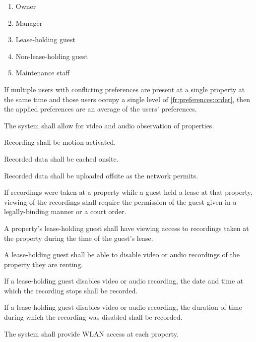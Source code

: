 \documentclass[letter,titlepage,oneside,english]{report}
\begin{document}
\begin{fr}
\begin{fr}
    \begin{enumerate}
    \item
      Owner
    \item
      Manager
    \item
      Lease-holding guest
    \item
      Non-lease-holding guest
    \item
      Maintenance staff
    \end{enumerate}
  \item
    If multiple users with conflicting preferences are present at a single property at the same time and those users occupy a single level of \ref{fr:preferences:order}, then the applied preferences are an average of the users' preferences.
  \end{fr}
\item
  The system shall allow for video and audio observation of properties.
  \begin{fr}
  \item
    Recording shall be motion-activated.
  \item
    Recorded data shall be cached onsite.
  \item
    Recorded data shall be uploaded offsite as the network permits.
  \item
    If recordings were taken at a property while a guest held a lease at that property, viewing of the recordings shall require the permission of the guest given in a legally-binding manner or a court order.
  \item
    A property's lease-holding guest shall have viewing access to recordings taken at the property during the time of the guest's lease.
  \item
    A lease-holding guest shall be able to disable video or audio recordings of the property they are renting.
    \begin{fr}
    \item
      If a lease-holding guest disables video or audio recording, the date and time at which the recording stops shall be recorded.
    \item
      If a lease-holding guest disables video or audio recording, the duration of time during which the recording was disabled shall be recorded.
    \end{fr}
  \end{fr}
\item
  The system shall provide WLAN access at each property.
  \begin{fr}
  \item

\end{fr}
\end{fr}
\end{document}
